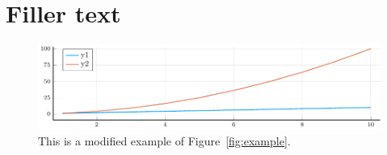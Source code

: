 \documentclass[9ptm,twocolumn]{article}
\begin{document}
\section{Filler text}

\lipsum[2-3]



\lipsum[4]

\begin{figure}
\centering
\tikzexternalenable %
\includegraphics{figures/example_figure_modified.pdf} %
\caption{This is a modified example of Figure~\ref{fig:example}.}
\label{fig:example_modified}
\tikzexternaldisable
\end{figure}

\lipsum[5-12]
\end{document}
